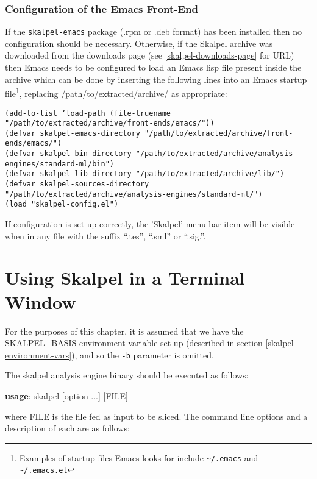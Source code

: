 \documentclass{report}
\begin{document}
\subsection{Configuration of the Emacs Front-End}

If the \texttt{skalpel-emacs} package (.rpm or .deb format) has been
installed then no configuration should be necessary. Otherwise, if the
Skalpel archive was downloaded from the downloads page (see
\ref{skalpel-downloads-page} for URL) then Emacs needs to be
configured to load an Emacs lisp file present inside the archive which
can be done by inserting the following lines into an Emacs startup
file\footnote{ Examples of startup files Emacs looks for include
  \texttt{{\textasciitilde}/.emacs} and
  \texttt{{\textasciitilde}/.emacs.el}}, replacing
/path/to/extracted/archive/ as appropriate:

\noindent \texttt{(add-to-list 'load-path (file-truename "/path/to/extracted/archive/front-ends/emacs/"))}\\
\texttt{(defvar skalpel-emacs-directory "/path/to/extracted/archive/front-ends/emacs/")}\\
\texttt{(defvar skalpel-bin-directory "/path/to/extracted/archive/analysis-engines/standard-ml/bin")}\\
\texttt{(defvar skalpel-lib-directory "/path/to/extracted/archive/lib/")}\\
\texttt{(defvar skalpel-sources-directory "/path/to/extracted/archive/analysis-engines/standard-ml/")}\\
\texttt{(load "skalpel-config.el")}

If configuration is set up correctly, the 'Skalpel' menu bar item will
be visible when in any file with the suffix ``.tes'', ``.sml'' or
``.sig.''.

\chapter{Using Skalpel in a Terminal Window}
\label{command-line-arguments}

For the purposes of this chapter, it is assumed that we have the
SKALPEL\_BASIS environment variable set up (described in section
\ref{skalpel-environment-vars}), and so the \texttt{-b} parameter is
omitted.

The skalpel analysis engine binary should be executed as follows:

\noindent \textbf{usage}: skalpel [option ...] [FILE]

where FILE is the file fed as input to be sliced. The command line
options and a description of each are as follows:
\end{document}
